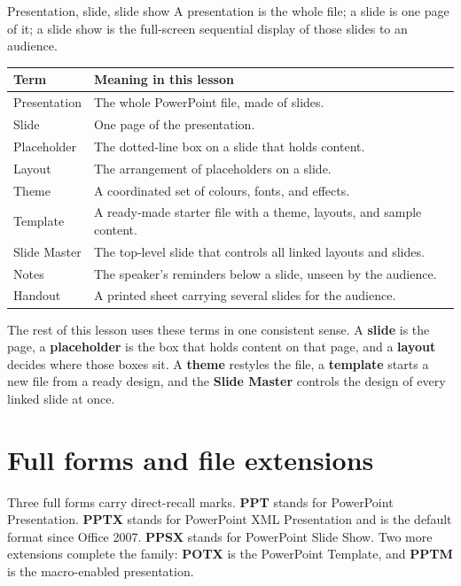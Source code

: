 \begin{definitionbox}{Presentation, slide, slide show}
A presentation is the whole file; a slide is one page of it; a slide show is
the full-screen sequential display of those slides to an audience.
\end{definitionbox}

\begin{center}
\begin{tabular}{p{}p{}}
\toprule
\textbf{Term} & \textbf{Meaning in this lesson} \\
\midrule
Presentation & The whole PowerPoint file, made of slides. \\
Slide & One page of the presentation. \\
Placeholder & The dotted-line box on a slide that holds content. \\
Layout & The arrangement of placeholders on a slide. \\
Theme & A coordinated set of colours, fonts, and effects. \\
Template & A ready-made starter file with a theme, layouts, and sample content. \\
Slide Master & The top-level slide that controls all linked layouts and slides. \\
Notes & The speaker's reminders below a slide, unseen by the audience. \\
Handout & A printed sheet carrying several slides for the audience. \\
\bottomrule
\end{tabular}
\end{center}

The rest of this lesson uses these terms in one consistent sense. A
\textbf{slide} is the page, a \textbf{placeholder} is the box that holds
content on that page, and a \textbf{layout} decides where those boxes sit. A
\textbf{theme} restyles the file, a \textbf{template} starts a new file from a
ready design, and the \textbf{Slide Master} controls the design of every
linked slide at once.

\section{Full forms and file extensions}
Three full forms carry direct-recall marks. \textbf{PPT} stands for PowerPoint
Presentation. \textbf{PPTX} stands for PowerPoint XML Presentation and is the
default format since Office 2007. \textbf{PPSX} stands for PowerPoint Slide
Show. Two more extensions complete the family: \textbf{POTX} is the PowerPoint
Template, and \textbf{PPTM} is the macro-enabled presentation.


